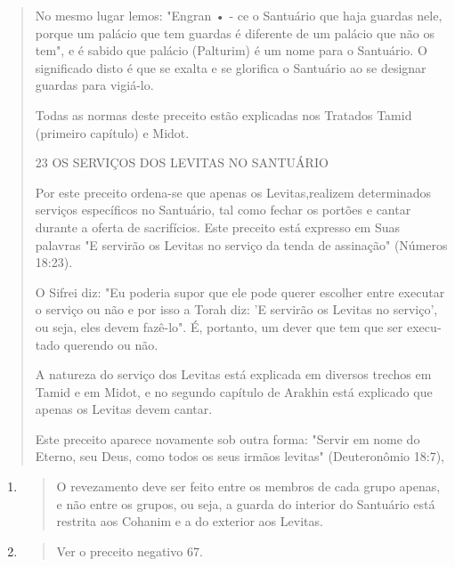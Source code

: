 \begin{quote}
No mesmo lugar lemos: "Engran • - ce o Santuário que haja guardas nele,
porque um palácio que tem guardas é diferente de um palácio que não os
tem", e é sabido que palácio (Palturim) é um nome para o Santuário. O
signi­ficado disto é que se exalta e se glorifica o Santuário ao se
designar guardas pa­ra vigiá-lo.

Todas as normas deste preceito estão explicadas nos Tratados Ta­mid
(primeiro capítulo) e Midot.

23 OS SERVIÇOS DOS LEVITAS NO SANTUÁRIO

Por este preceito ordena-se que apenas os Levitas,realizem determi­nados
serviços específicos no Santuário, tal como fechar os portões e cantar
durante a oferta de sacrifícios. Este preceito está expresso em Suas
palavras "E servirão os Levitas no serviço da tenda de assinação"
(Números 18:23).

O Sifrei diz: "Eu poderia supor que ele pode querer escolher entre
executar o serviço ou não e por isso a Torah diz: 'E servirão os Levitas
no servi­ço', ou seja, eles devem fazê-lo". É, portanto, um dever que
tem que ser execu­tado querendo ou não.

A natureza do serviço dos Levitas está explicada em diversos trechos em
Tamid e em Midot, e no segundo capítulo de Arakhin está explicado que
apenas os Levitas devem cantar.

Este preceito aparece novamente sob outra forma: "Servir em nome do
Eterno, seu Deus, como todos os seus irmãos levitas" (Deuteronômio
18:7),
\end{quote}

\begin{enumerate}
\def\labelenumi{\arabic{enumi}.}
\setcounter{enumi}{47}
\item
  \begin{quote}
  O revezamento deve ser feito entre os membros de cada grupo apenas, e
  não entre os grupos, ou seja, a guarda do interior do Santuário está
  restrita aos Cohanim e a do exterior aos Levitas.
  \end{quote}
\item
  \begin{quote}
  Ver o preceito negativo 67.
  \end{quote}
\end{enumerate}

